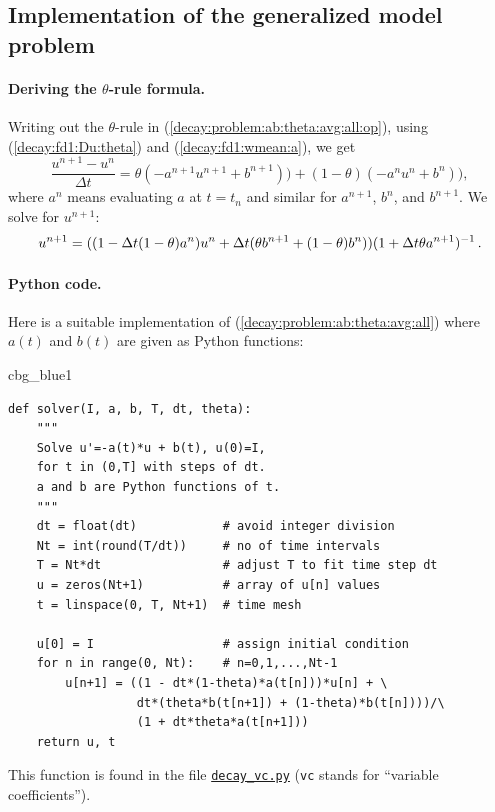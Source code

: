 \documentclass[%
oneside,                 %
final,                   %
10pt]{article}
\newenvironment{_cod_tight}[1]{
   \def\FrameCommand{\colorbox{#1}}
   \FrameRule0.6pt\MakeFramed {\FrameRestore}\vskip3mm}
   {\vskip0mm\endMakeFramed}
\newenvironment{cod}[1]{
\bgroup\rmfamily
\fboxsep=0mm\relax
\begin{_cod_tight}{#1}
\list{}{\parsep=-2mm\parskip=0mm\topsep=0pt\leftmargin=2mm
\rightmargin=2\leftmargin\leftmargin=4pt\relax}
\item\relax}
{\endlist\end{_cod_tight}\egroup}
\begin{document}
\subsection{Implementation of the generalized model problem}
\label{decay:general}

\paragraph{Deriving the $\theta$-rule formula.}
Writing out the $\theta$-rule in (\ref{decay:problem:ab:theta:avg:all:op}),
using (\ref{decay:fd1:Du:theta})
and (\ref{decay:fd1:wmean:a}), we get
\begin{equation}
\frac{u^{n+1}-u^n}{\Delta t} = \theta(-a^{n+1}u^{n+1} + b^{n+1}))
+ (1-\theta)(-a^nu^{n} + b^n)),
\label{decay:problem:ab:theta:avg:all}
\end{equation}
where $a^n$ means evaluating $a$ at $t=t_n$ and similar for
$a^{n+1}$, $b^n$, and $b^{n+1}$.
We solve for $u^{n+1}$:
\begin{equation}
u^{n+1} = ((1 - \Delta t(1-\theta)a^n)u^n
+ \Delta t(\theta b^{n+1} + (1-\theta)b^n))(1 + \Delta t\theta a^{n+1})^{-1}
\thinspace .
\end{equation}

\paragraph{Python code.}
Here is a suitable implementation of (\ref{decay:problem:ab:theta:avg:all})
where $a(t)$ and $b(t)$ are given as
Python functions:

\begin{cod}{cbg_blue1}\begin{Verbatim}[numbers=none,fontsize=\fontsize{9pt}{9pt},baselinestretch=0.95,xleftmargin=2mm]
def solver(I, a, b, T, dt, theta):
    """
    Solve u'=-a(t)*u + b(t), u(0)=I,
    for t in (0,T] with steps of dt.
    a and b are Python functions of t.
    """
    dt = float(dt)            # avoid integer division
    Nt = int(round(T/dt))     # no of time intervals
    T = Nt*dt                 # adjust T to fit time step dt
    u = zeros(Nt+1)           # array of u[n] values
    t = linspace(0, T, Nt+1)  # time mesh

    u[0] = I                  # assign initial condition
    for n in range(0, Nt):    # n=0,1,...,Nt-1
        u[n+1] = ((1 - dt*(1-theta)*a(t[n]))*u[n] + \ 
                  dt*(theta*b(t[n+1]) + (1-theta)*b(t[n])))/\ 
                  (1 + dt*theta*a(t[n+1]))
    return u, t
\end{Verbatim}
\end{cod}
\noindent
This function is found in the file \href{{http://tinyurl.com/ofkw6kc/genz/decay_vc.py}}{\nolinkurl{decay_vc.py}} (\texttt{vc} stands for ``variable coefficients'').
\end{document}
